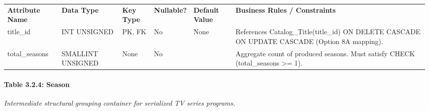 {\def\LTcaptype{none} %
\begin{longtable}[]{@{}
  >{\raggedright\arraybackslash}p{}
  >{\raggedright\arraybackslash}p{}
  >{\raggedright\arraybackslash}p{}
  >{\raggedright\arraybackslash}p{}
  >{\raggedright\arraybackslash}p{}
  >{\raggedright\arraybackslash}p{}@{}}
\arrayrulecolor{black}\toprule\noalign{}
\endhead
\bottomrule\noalign{}
\endlastfoot
\textbf{Attribute Name} & \textbf{Data Type} & \textbf{Key Type} & \textbf{Nullable?} & \textbf{Default Value} & \textbf{Business Rules / Constraints} \\ \arrayrulecolor{black}\midrule
title\_\allowbreak{}id & INT UNSIGNED & PK, FK & No & None & References Catalog\_\allowbreak{}Title(title\_\allowbreak{}id) ON DELETE CASCADE ON UPDATE CASCADE (Option 8A mapping). \\ \arrayrulecolor{black!20}\midrule
total\_\allowbreak{}seasons & SMALLINT UNSIGNED & None & No & 1 & Aggregate count of produced seasons. Must satisfy CHECK (total\_\allowbreak{}seasons \textgreater= 1). \\
\end{longtable}
}

\paragraph{Table 3.2.4: Season}\label{table-3.2.4-season}

\emph{Intermediate structural grouping container for serialized TV series programs.}

